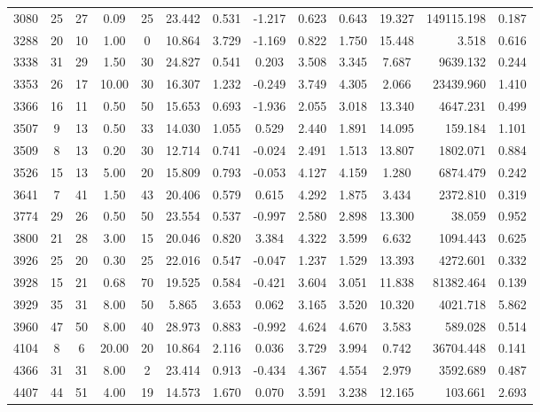 \documentclass[mnsc]{informs3}
\begin{document}
\begin{APPENDICES}
\begin{longtable}{cccccccccccrc}
3080 & 25 & 27 & 0.09 & 25 & 23.442 & 0.531 & -1.217 & 0.623 & 0.643 & 19.327 & 149115.198 & 0.187 \\
3288 & 20 & 10 & 1.00 & 0 & 10.864 & 3.729 & -1.169 & 0.822 & 1.750 & 15.448 & 3.518 & 0.616 \\
3338 & 31 & 29 & 1.50 & 30 & 24.827 & 0.541 & 0.203 & 3.508 & 3.345 & 7.687 & 9639.132 & 0.244 \\
3353 & 26 & 17 & 10.00 & 30 & 16.307 & 1.232 & -0.249 & 3.749 & 4.305 & 2.066 & 23439.960 & 1.410 \\
3366 & 16 & 11 & 0.50 & 50 & 15.653 & 0.693 & -1.936 & 2.055 & 3.018 & 13.340 & 4647.231 & 0.499 \\
3507 & 9 & 13 & 0.50 & 33 & 14.030 & 1.055 & 0.529 & 2.440 & 1.891 & 14.095 & 159.184 & 1.101 \\
3509 & 8 & 13 & 0.20 & 30 & 12.714 & 0.741 & -0.024 & 2.491 & 1.513 & 13.807 & 1802.071 & 0.884 \\
3526 & 15 & 13 & 5.00 & 20 & 15.809 & 0.793 & -0.053 & 4.127 & 4.159 & 1.280 & 6874.479 & 0.242 \\
3641 & 7 & 41 & 1.50 & 43 & 20.406 & 0.579 & 0.615 & 4.292 & 1.875 & 3.434 & 2372.810 & 0.319 \\
3774 & 29 & 26 & 0.50 & 50 & 23.554 & 0.537 & -0.997 & 2.580 & 2.898 & 13.300 & 38.059 & 0.952 \\
3800 & 21 & 28 & 3.00 & 15 & 20.046 & 0.820 & 3.384 & 4.322 & 3.599 & 6.632 & 1094.443 & 0.625 \\
3926 & 25 & 20 & 0.30 & 25 & 22.016 & 0.547 & -0.047 & 1.237 & 1.529 & 13.393 & 4272.601 & 0.332 \\
3928 & 15 & 21 & 0.68 & 70 & 19.525 & 0.584 & -0.421 & 3.604 & 3.051 & 11.838 & 81382.464 & 0.139 \\
3929 & 35 & 31 & 8.00 & 50 & 5.865 & 3.653 & 0.062 & 3.165 & 3.520 & 10.320 & 4021.718 & 5.862 \\
3960 & 47 & 50 & 8.00 & 40 & 28.973 & 0.883 & -0.992 & 4.624 & 4.670 & 3.583 & 589.028 & 0.514 \\
4104 & 8 & 6 & 20.00 & 20 & 10.864 & 2.116 & 0.036 & 3.729 & 3.994 & 0.742 & 36704.448 & 0.141 \\
4366 & 31 & 31 & 8.00 & 2 & 23.414 & 0.913 & -0.434 & 4.367 & 4.554 & 2.979 & 3592.689 & 0.487 \\
4407 & 44 & 51 & 4.00 & 19 & 14.573 & 1.670 & 0.070 & 3.591 & 3.238 & 12.165 & 103.661 & 2.693 \\

\end{longtable}
\end{APPENDICES}
\end{document}
